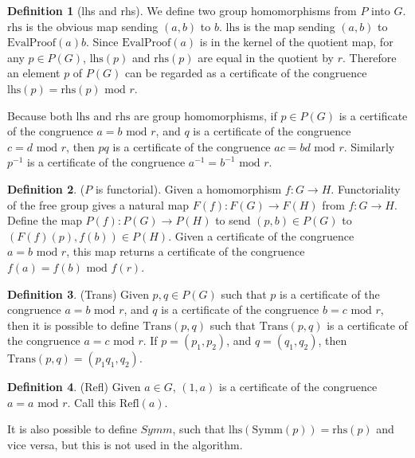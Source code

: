 \documentclass[11pt]{article} %
\theoremstyle{definition}
\theoremstyle{definition}
\theoremstyle{definition}
\theoremstyle{definition}
\theoremstyle{definition}
\theoremstyle{definition}
\newtheorem{subdef}{Definition}[theorem]
\begin{document}
\begin{subdef}[lhs and rhs]
We define two group homomorphisms from $P$ into $G$. $\text{rhs}$ is the obvious map sending $(a, b)$ to $b$.
$\text{lhs}$ is the map sending $(a,b)$ to $\text{EvalProof}(a)b$.
Since $\text{EvalProof}(a)$ is in the kernel of the quotient map,
for any $p\in P(G)$, $\text{lhs}(p)$ and $\text{rhs}(p)$ are equal in the quotient by $r$.
Therefore an element $p$ of $P(G)$ can be regarded as a certificate of the congruence
$\text{lhs}(p) = \text{rhs}(p) \text{ mod } r$.
\end{subdef}

Because both $\text{lhs}$ and $\text{rhs}$ are group homomorphisms, if $p \in P(G)$ is a certificate
of the congruence $a = b \text{ mod } r$, and $q$ is a certificate of the congruence
$c = d \text{ mod } r$, then $pq$ is a certificate of the congruence $ac = bd \text{ mod } r$.
Similarly $p^{-1}$ is a certificate of the congruence $a^{-1} = b^{-1} \text{ mod } r$.

\begin{subdef}($P$ is functorial).
  Given a homomorphism $f : G \to H$.
  Functoriality of the free group gives a natural map $F(f) : F(G) \to F(H)$ from $f : G \to H$.
  Define the map $P(f) : P(G) \to P(H)$ to send $(p, b) \in P(G)$ to $(F(f)(p), f(b)) \in P(H)$.
  Given a certificate of the congruence $a = b \text{ mod } r$, this map returns
  a certificate of the congruence $f(a) = f(b) \text{ mod } f(r)$.
\end{subdef}


\begin{subdef}(Trans)
  Given $p,q \in P(G)$ such that $p$ is a certificate of the congruence $a = b \text{ mod } r$,
  and $q$ is a certificate of the congruence $b = c \text{ mod } r$, then it is possible to define
  $\text{Trans}(p,q)$ such that $\text{Trans}(p,q)$ is a certificate of the congruence $a = c \text{ mod } r$.
  If $p = (p_1, p_2)$, and $q = (q_1, q_2)$, then $\text{Trans}(p,q) = (p_1q_1, q_2)$.
\end{subdef}

\begin{subdef}(Refl)
  Given $a \in G$, $(1, a)$ is a certificate of the congruence $a = a \text{ mod } r$. Call
  this $\text{Refl}(a)$.
\end{subdef}

It is also possible to define $\textit{Symm}$, such that $\text{lhs}(\text{Symm}(p)) = \text{rhs}(p)$
and vice versa, but this is not used in the algorithm.
\end{document}
